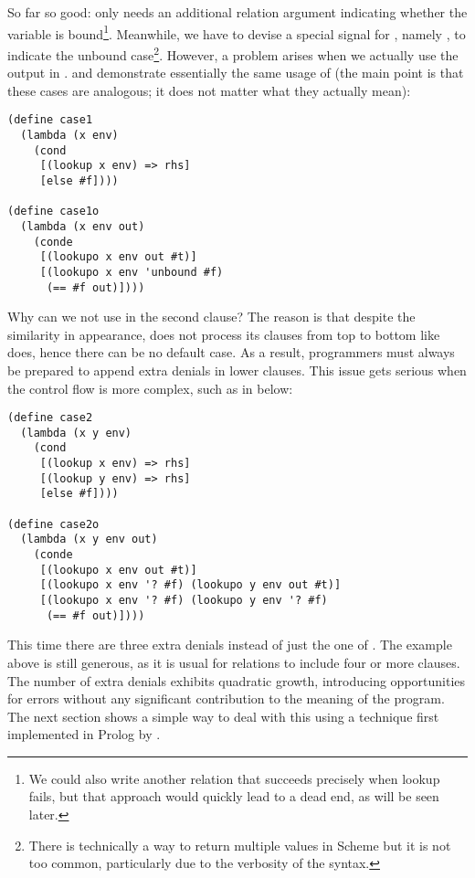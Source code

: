 So far so good:  only needs an additional relation argument indicating whether the variable is bound\footnote{We could also write another relation that succeeds precisely when lookup fails, but that approach would quickly lead to a dead end, as will be seen later.}. Meanwhile, we have to devise a special signal for , namely , to indicate the unbound case\footnote{There is technically a way to return multiple values in Scheme but it is not too common, particularly due to the verbosity of the syntax.}. However, a problem arises when we actually use the output in .  and  demonstrate essentially the same usage of  (the main point is that these cases are analogous; it does not matter what they actually mean):
\begin{lstlisting}
(define case1
  (lambda (x env)
    (cond
     [(lookup x env) => rhs]
     [else #f])))

(define case1o
  (lambda (x env out)
    (conde
     [(lookupo x env out #t)]
     [(lookupo x env 'unbound #f)
      (== #f out)])))
\end{lstlisting}

Why can we not use  in the second clause? The reason is that despite the similarity in appearance,  does not process its clauses from top to bottom like  does, hence there can be no default case. As a result, programmers must always be prepared to append extra denials in lower  clauses. This issue gets serious when the control flow is more complex, such as in  below:

\begin{lstlisting}
(define case2
  (lambda (x y env)
    (cond
     [(lookup x env) => rhs]
     [(lookup y env) => rhs]
     [else #f])))

(define case2o
  (lambda (x y env out)
    (conde
     [(lookupo x env out #t)]
     [(lookupo x env '? #f) (lookupo y env out #t)]
     [(lookupo x env '? #f) (lookupo y env '? #f)
      (== #f out)])))
\end{lstlisting}

This time there are three extra denials instead of just the one of . The example above is still generous, as it is usual for relations to include four or more  clauses. The number of extra denials exhibits quadratic growth, introducing opportunities for errors without any significant contribution to the meaning of the program. The next section shows a simple way to deal with this using a technique first implemented in Prolog by \textcite{reif}.

